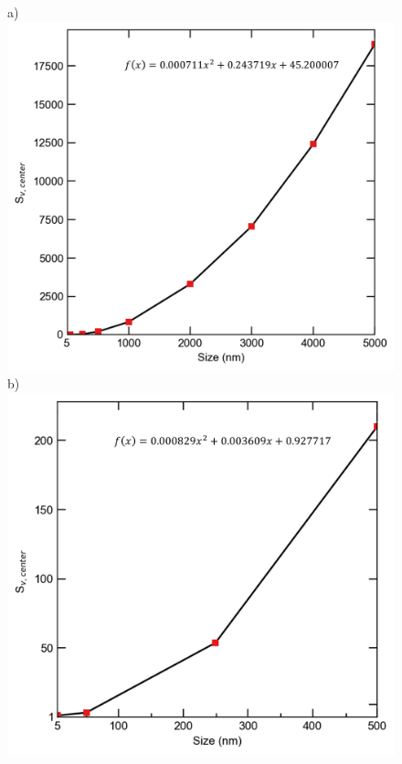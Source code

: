 \documentclass[utf8]{frontiersSCNS} %
\begin{document}
    \begin{figure}[h!]
        \centering
        a)\includegraphics[scale=0.55]{Fig8_a}
        \\
        \qquad
        b)\includegraphics[scale=0.55]{Fig8_b}

\end{figure}
\end{document}
